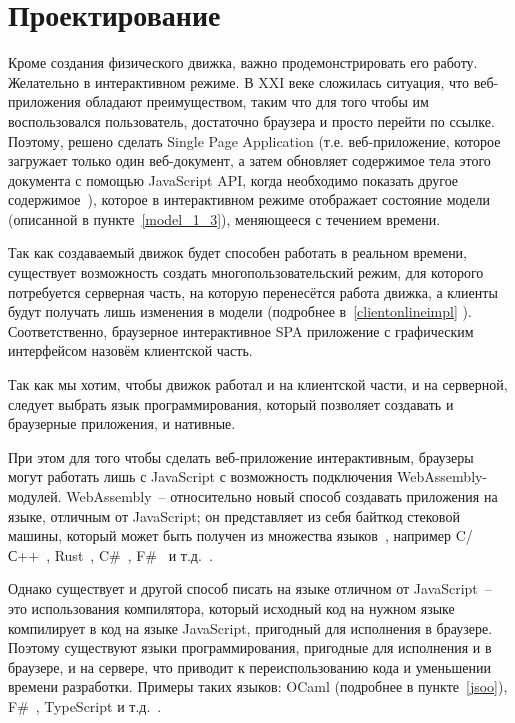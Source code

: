 \chapter{Проектирование}\label{chapter-design}

Кроме создания физического движка, важно продемонстрировать его работу.
Желательно в интерактивном режиме. В XXI веке сложилась ситуация, что веб-приложения
обладают преимуществом, таким что для того чтобы им воспользовался пользователь, достаточно
браузера и просто перейти по ссылке.
Поэтому, решено сделать Single Page Application
(т.е. веб-приложение, которое загружает только один веб-документ,
а затем обновляет содержимое тела этого документа с помощью JavaScript API,
когда необходимо показать другое содержимое~\cite{mdn-spa}),
которое в интерактивном режиме отображает состояние модели (описанной в пункте~\ref{model_1_3}),
меняющееся с течением времени.

Так как создаваемый движок будет способен работать в реальном времени, существует возможность
создать многопользовательский режим, для которого потребуется серверная часть,
на которую перенесётся работа движка, а клиенты будут получать лишь изменения в модели (подробнее в~\ref{clientonlineimpl} \TODO).
Соответственно, браузерное интерактивное SPA приложение с графическим интерфейсом назовём клиентской часть.

Так как мы хотим, чтобы движок работал и на клиентской части, и на серверной, следует выбрать язык программирования,
который позволяет создавать и браузерные приложения, и нативные.

При этом для того чтобы сделать веб-приложение интерактивным, браузеры могут работать лишь с JavaScript
с возможность подключения WebAssembly-модулей. WebAssembly~-- относительно новый способ создавать
приложения на языке, отличным от JavaScript; он представляет из себя байткод стековой машины,
который может быть получен из множества языков~\cite{wasm}, например
C/С++~\cite{emscripten-about}, Rust~\cite{rust-wasm}, C\#~\cite{blazor-ru}, F\#~\cite{fsbolero} и т.д.~\cite{wasm-iwantto}.

Однако существует и другой способ
писать на языке отличном от JavaScript~-- это использования компилятора, который исходный код на нужном языке
компилирует в код на языке JavaScript, пригодный для исполнения в браузере. Поэтому существуют языки программирования,
пригодные для исполнения и в браузере, и на сервере, что приводит к переиспользованию кода и уменьшении времени разработки.
Примеры таких языков: OCaml (подробнее в пункте~\ref{jsoo}), F\#~\cite[с.~48]{dsyme-hopl}, TypeScript и т.д.~\cite{typescript-mayorov}.


